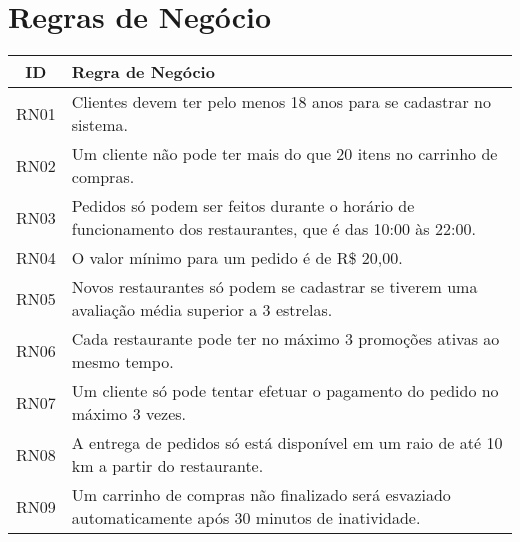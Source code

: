 \section{Regras de Negócio}
\begin{longtable}{|c|p{10cm}|}
\hline
\textbf{ID} & \textbf{Regra de Negócio} \\
\hline
RN01 & Clientes devem ter pelo menos 18 anos para se cadastrar no sistema. \\
\hline
RN02 & Um cliente não pode ter mais do que 20 itens no carrinho de compras. \\
\hline
RN03 & Pedidos só podem ser feitos durante o horário de funcionamento dos restaurantes, que é das 10:00 às 22:00. \\
\hline
RN04 & O valor mínimo para um pedido é de R\$ 20,00. \\
\hline
RN05 & Novos restaurantes só podem se cadastrar se tiverem uma avaliação média superior a 3 estrelas. \\
\hline
RN06 & Cada restaurante pode ter no máximo 3 promoções ativas ao mesmo tempo. \\
\hline
RN07 & Um cliente só pode tentar efetuar o pagamento do pedido no máximo 3 vezes. \\
\hline
RN08 & A entrega de pedidos só está disponível em um raio de até 10 km a partir do restaurante. \\
\hline
RN09 & Um carrinho de compras não finalizado será esvaziado automaticamente após 30 minutos de inatividade. \\
\hline
\end{longtable}